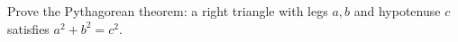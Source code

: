 Prove the Pythagorean theorem: a right triangle with legs $a,b$ and hypotenuse $c$ satisfies $a^2+b^2=c^2$.
